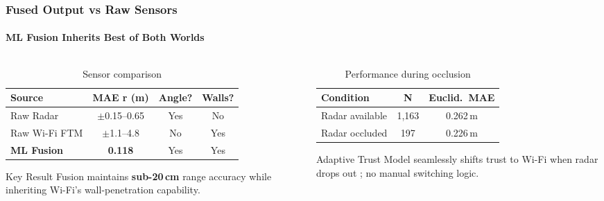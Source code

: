 \documentclass[
	11pt,
	aspectratio=169,
]{beamer}
\begin{document}
\begin{frame}
	\frametitle{Fused Output vs Raw Sensors}
	\framesubtitle{ML Fusion Inherits Best of Both Worlds}

	\begin{columns}[c]
		\begin{column}{0.50\textwidth}
			\scriptsize
			\begin{table}
				\centering
				\begin{tabular}{l c c c}
					\toprule
					\textbf{Source} & \textbf{MAE r (m)} & \textbf{Angle?} & \textbf{Walls?} \\
					\midrule
					Raw Radar & $\pm$0.15--0.65 & Yes & No \\
					Raw Wi-Fi FTM & $\pm$1.1--4.8 & No & Yes \\
					\textbf{ML Fusion} & \alert{\textbf{0.118}} & \alert{Yes} & \alert{Yes} \\
					\bottomrule
				\end{tabular}
				\caption{Sensor comparison}
			\end{table}

			\smallskip
			\begin{exampleblock}{Key Result}
				Fusion maintains \textbf{sub-20\,cm} range accuracy while inheriting Wi-Fi's wall-penetration capability.
			\end{exampleblock}
		\end{column}

		\begin{column}{0.45\textwidth}
			\scriptsize
			\begin{table}
				\centering
				\begin{tabular}{l c c}
					\toprule
					\textbf{Condition} & \textbf{N} & \textbf{Euclid.\ MAE} \\
					\midrule
					Radar available & 1,163 & 0.262\,m \\
					Radar occluded & 197 & 0.226\,m \\
					\bottomrule
				\end{tabular}
				\caption{Performance during occlusion}
			\end{table}

			\smallskip
			\begin{block}{Adaptive Trust}
				Model seamlessly shifts trust to Wi-Fi when radar drops out ; \alert{no manual switching} logic.
			\end{block}
		\end{column}
	\end{columns}
\end{frame}
\end{document}
